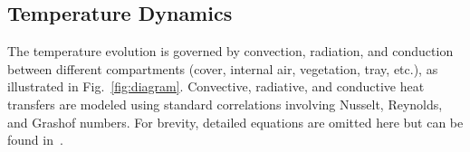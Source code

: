 \documentclass[conference]{IEEEtran}
\begin{document}
\subsection{Temperature Dynamics}\label{subsec:temperature}

The temperature evolution is governed by convection, radiation, and conduction between different compartments (cover, internal air, vegetation, tray, etc.), as illustrated in Fig.~\ref{fig:diagram}.
Convective, radiative, and conductive heat transfers are modeled using standard correlations involving Nusselt, Reynolds, and Grashof numbers. For brevity, detailed equations are omitted here but can be found in~\cite{Ward2019,Vanthoor2011}.


\end{document}

